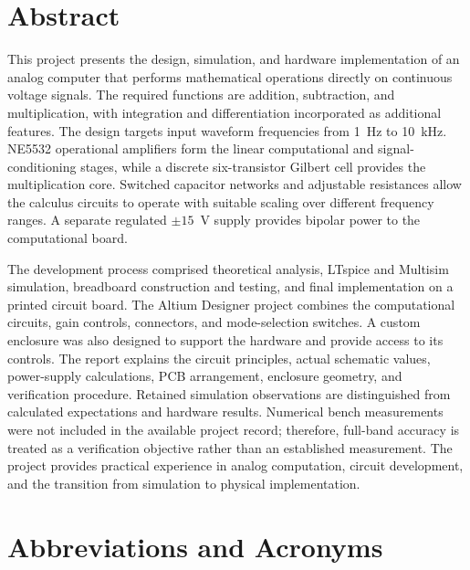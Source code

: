 \documentclass[11pt,a4paper]{article}
\renewenvironment{abstract}{\section*{Abstract}\addcontentsline{toc}{section}{Abstract}}{\par}
\begin{document}
\begin{abstract}
This project presents the design, simulation, and hardware implementation of an analog computer that performs mathematical operations directly on continuous voltage signals. The required functions are addition, subtraction, and multiplication, with integration and differentiation incorporated as additional features. The design targets input waveform frequencies from 1~Hz to 10~kHz. NE5532 operational amplifiers form the linear computational and signal-conditioning stages, while a discrete six-transistor Gilbert cell provides the multiplication core. Switched capacitor networks and adjustable resistances allow the calculus circuits to operate with suitable scaling over different frequency ranges. A separate regulated $\pm15$~V supply provides bipolar power to the computational board.

The development process comprised theoretical analysis, LTspice and Multisim simulation, breadboard construction and testing, and final implementation on a printed circuit board. The Altium Designer project combines the computational circuits, gain controls, connectors, and mode-selection switches. A custom enclosure was also designed to support the hardware and provide access to its controls. The report explains the circuit principles, actual schematic values, power-supply calculations, PCB arrangement, enclosure geometry, and verification procedure. Retained simulation observations are distinguished from calculated expectations and hardware results. Numerical bench measurements were not included in the available project record; therefore, full-band accuracy is treated as a verification objective rather than an established measurement. The project provides practical experience in analog computation, circuit development, and the transition from simulation to physical implementation.
\end{abstract}
\clearpage

\section*{Abbreviations and Acronyms}
\begin{acronym}[MOSFET]
\end{acronym}
\clearpage
\tableofcontents
\clearpage
{}
\end{document}

